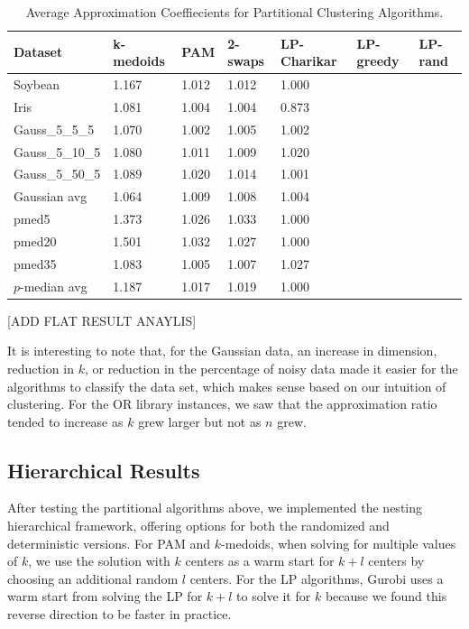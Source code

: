 \documentclass[conference, 10pt, final]{IEEEtran}
\begin{document}
\begin{table}[!t]
\label{fig:flat_results_approx}
\caption{Average Approximation Coeffiecients for Partitional Clustering Algorithms.}
\centering
\begin{tabular}{ | l | l | l | l | l | l| l|}
\hline
Dataset	&	k-medoids	&	PAM	&	2-swaps	&	LP-Charikar	&	LP-greedy	&	LP-rand	\\ \hline
Soybean	&	1.167	&	1.012	&	1.012	&	1.000	&		&		\\
Iris	&	1.081	&	1.004	&	1.004	&	0.873	&		&		\\
Gauss\_5\_5\_5	&	1.070	&	1.002	&	1.005	&	1.002	&		&		\\
Gauss\_5\_10\_5	&	1.080	&	1.011	&	1.009	&	1.020	&		&		\\
Gauss\_5\_50\_5	&	1.089	&	1.020	&	1.014	&	1.001	&		&		\\
Gaussian avg	&	1.064	&	1.009	&	1.008	&	1.004	&		&		\\
pmed5	&	1.373	&	1.026	&	1.033	&	1.000	&		&		\\
pmed20	&	1.501	&	1.032	&	1.027	&	1.000	&		&		\\
pmed35	&	1.083	&	1.005	&	1.007	&	1.027	&		&		\\
$p$-median avg	&	1.187	&	1.017	&	1.019	&	1.000	&		&		\\ \hline
\end{tabular}
\end{table}


[ADD FLAT RESULT ANAYLIS]

It is interesting to note that, for the Gaussian data, an increase in dimension, reduction in $k$, or reduction in the percentage of noisy data made it easier for the algorithms to classify the data set, which makes sense based on our intuition of clustering. For the OR library instances, we saw that the approximation ratio tended to increase as $k$ grew larger but not as $n$ grew. 

\subsection{Hierarchical Results}
After testing the partitional algorithms above, we implemented the nesting hierarchical framework, offering options for both the randomized and deterministic versions. For PAM and $k$-medoids, when solving for multiple values of $k$, we use the solution with $k$ centers as a warm start for $k+l$ centers by choosing an additional random $l$ centers. For the LP algorithms, Gurobi uses a warm start from solving the LP for $k+l$ to solve it for $k$ because we found this reverse direction to be faster in practice. 
\end{document}
